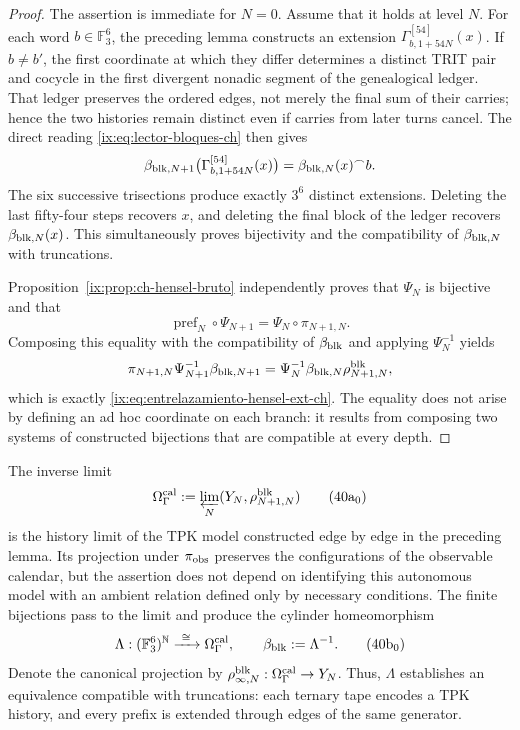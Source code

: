 \begin{proof}
The assertion is immediate for \(N=0\). Assume that it holds at level
\(N\). For each word \(b\in\mathbb F_3^6\), the preceding lemma constructs an extension
    \(\Gamma_{b,1+54N}^{[54]}(x)\). If \(b\ne b'\), the first coordinate at
which they differ determines a distinct TRIT pair and cocycle in the first
divergent nonadic segment of the genealogical ledger. That ledger preserves
the ordered edges, not merely the final sum of their carries; hence the two
histories remain distinct even if carries from later turns cancel.
The direct reading \eqref{ix:eq:lector-bloques-ch} then gives
\begin{equation}
 \beta_{{\rm blk},N+1}
 \bigl(\Gamma_{b,1+54N}^{[54]}(x)\bigr)
 =\beta_{{\rm blk},N}(x)^\frown b.
 \label{ix:eq:beta-concatenacion-demostrada-ch}
\end{equation}
The six successive trisections produce exactly \(3^6\) distinct extensions.
Deleting the last fifty-four steps recovers \(x\), and deleting the final
block of the ledger recovers \(\beta_{{\rm blk},N}(x)\). This simultaneously
proves bijectivity and the compatibility of \(\beta_{{\rm blk},N}\) with
truncations.

Proposition~\ref{ix:prop:ch-hensel-bruto} independently proves that
\(\Psi_N\) is bijective and that
\[
 \operatorname{pref}_N\circ\Psi_{N+1}
 =\Psi_N\circ\pi_{N+1,N}.
\]
Composing this equality with the compatibility of \(\beta_{\rm blk}\) and
applying \(\Psi_N^{-1}\) yields
\[
 \pi_{N+1,N}\Psi_{N+1}^{-1}\beta_{{\rm blk},N+1}
 =\Psi_N^{-1}\beta_{{\rm blk},N}\rho^{\rm blk}_{N+1,N},
\]
which is exactly \eqref{ix:eq:entrelazamiento-hensel-ext-ch}. The equality does
not arise by defining an ad hoc coordinate on each branch: it results from
composing two systems of constructed bijections that are compatible at every
depth.
\end{proof}

The inverse limit
\[
 \Omega_\Gamma^{\rm cal}:=
 \varprojlim_N(Y_N,\rho^{\rm blk}_{N+1,N})
\tag{40a$_0$}
\label{ix:eq:omega-gamma-catalogal-ch}
\]
is the history limit of the TPK model constructed edge by edge in the
preceding lemma. Its projection under \(\pi_{\rm obs}\) preserves the
configurations of the observable calendar, but the assertion does not depend
on identifying this autonomous model with an ambient relation defined only
by necessary conditions. The finite bijections pass to the limit and produce
the cylinder homeomorphism
\[
 \Lambda:(\mathbb F_3^6)^{\mathbb N}
 \xrightarrow{\ \cong\ }\Omega_\Gamma^{\rm cal},
 \qquad
 \beta_{\rm blk}:=\Lambda^{-1}.
\tag{40b$_0$}
\label{ix:eq:homeomorfismo-calibrado-ch}
\]
Denote the canonical projection by
\(\rho^{\rm blk}_{\infty,N}:\Omega_\Gamma^{\rm cal}\to Y_N\).
Thus, \(\Lambda\) establishes an equivalence compatible with truncations:
each ternary tape encodes a TPK history, and every prefix is extended through
edges of the same generator.


